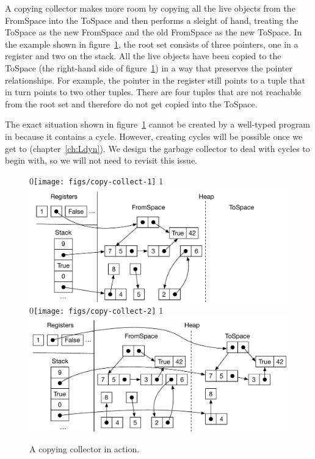 \documentclass[7x10]{TimesAPriori_MIT}%
\def\racketEd{0}
\def\pythonEd{1}
\def\edition{0}
\newcommand{\racket}[1]{{\if\edition\racketEd{#1}\fi}}
\newcommand{\python}[1]{{\if\edition\pythonEd #1\fi}}
\numberwithin{theorem}{chapter}
\numberwithin{definition}{chapter}
\numberwithin{equation}{chapter}
\begin{document}
A copying collector makes more room by copying all the live objects
from the FromSpace into the ToSpace and then performs a sleight of
hand, treating the ToSpace as the new FromSpace and the old FromSpace
as the new ToSpace.  In the example shown in
figure~\ref{fig:copying-collector}, the root set consists of three
pointers, one in a register and two on the stack. All the live
objects have been copied to the ToSpace (the right-hand side of
figure~\ref{fig:copying-collector}) in a way that preserves the
pointer relationships. For example, the pointer in the register still
points to a tuple that in turn points to two other tuples.  There are
four tuples that are not reachable from the root set and therefore do
not get copied into the ToSpace.

The exact situation shown in figure~\ref{fig:copying-collector} cannot be
created by a well-typed program in \LangVec{} because it contains a
cycle. However, creating cycles will be possible once we get to
\LangDyn{} (chapter~\ref{ch:Ldyn}).  We design the garbage collector
to deal with cycles to begin with, so we will not need to revisit this
issue.

\begin{figure}[tbp]
\centering
\begin{tcolorbox}[colback=white]
  \racket{\texttt{[image: figs/copy-collect-1]}}
\python{\includegraphics[width=\textwidth]{figs/copy-collect-1-python}}
\\[5ex]
\racket{\texttt{[image: figs/copy-collect-2]}}
\python{\includegraphics[width=\textwidth]{figs/copy-collect-2-python}}
\end{tcolorbox}

\caption{A copying collector in action.}
\label{fig:copying-collector}
\end{figure}
\end{document}
